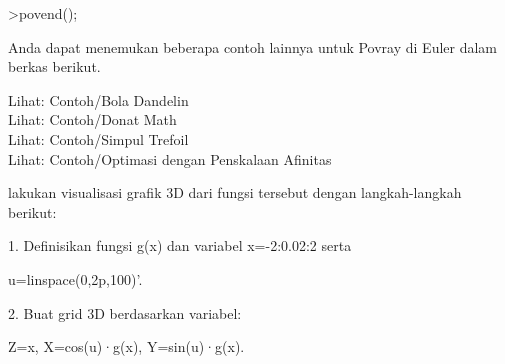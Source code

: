\documentclass[a4paper,10pt]{article}
\begin{document}
\begin{eulernotebook}
\begin{eulercomment}
\begin{eulercomment}
\begin{eulercomment}
\begin{eulercomment}
\begin{eulercomment}
\begin{eulercomment}
\begin{eulercomment}
\begin{eulercomment}
\begin{eulercomment}
\begin{eulercomment}
\begin{eulercomment}
\begin{eulercomment}
\begin{eulercomment}
\begin{eulercomment}
\begin{eulercomment}
\begin{eulercomment}
\begin{eulerprompt}
>povend();
\end{eulerprompt}
\begin{eulercomment}
Anda dapat menemukan beberapa contoh lainnya untuk Povray di Euler
dalam berkas berikut.

Lihat: Contoh/Bola Dandelin\\
Lihat: Contoh/Donat Math\\
Lihat: Contoh/Simpul Trefoil\\
Lihat: Contoh/Optimasi dengan Penskalaan Afinitas

\begin{eulercomment}
\begin{eulercomment}
lakukan visualisasi grafik 3D dari fungsi tersebut dengan
langkah-langkah berikut:

1. Definisikan fungsi g(x) dan variabel x=-2:0.02:2 serta\\
\end{eulercomment}
\begin{eulerttcomment}
   u=linspace(0,2p,100)'.
\end{eulerttcomment}
\begin{eulercomment}
2. Buat grid 3D berdasarkan variabel:\\
\end{eulercomment}
\begin{eulerttcomment}
   Z=x,
   X=cos(u)·g(x),
   Y=sin(u)·g(x).
\end{eulerttcomment}
\begin{eulercomment}


\end{eulercomment}
\end{eulercomment}
\end{eulercomment}
\end{eulercomment}
\end{eulercomment}
\end{eulercomment}
\end{eulercomment}
\end{eulercomment}
\end{eulercomment}
\end{eulercomment}
\end{eulercomment}
\end{eulercomment}
\end{eulercomment}
\end{eulercomment}
\end{eulercomment}
\end{eulercomment}
\end{eulercomment}
\end{eulercomment}
\end{eulercomment}
\end{eulernotebook}
\end{document}
